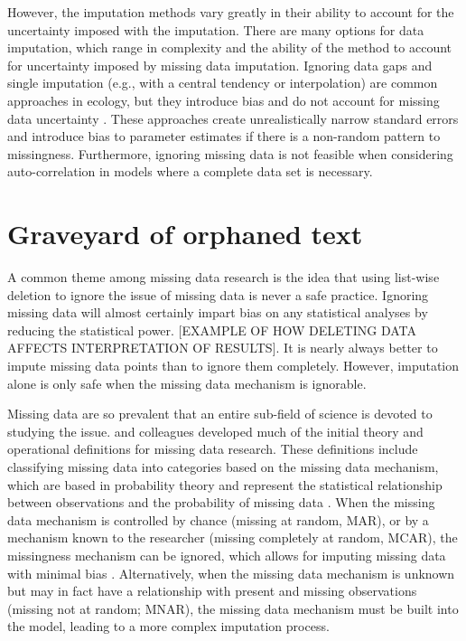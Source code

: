 
 
 
 
 However, the imputation methods vary greatly in their ability to account for the uncertainty imposed with the imputation. There are many options for data imputation, which range in complexity and the ability of the method to account for uncertainty imposed by missing data imputation. Ignoring data gaps and single imputation (e.g., with a central tendency or interpolation) are common approaches in ecology, but they introduce bias and do not account for missing data uncertainty \citep{nakagawa_missing_2008, graham_missing_2009}. These approaches create unrealistically narrow standard errors \citep{nakagawa_missing_2015,mcknight_missing_2007} and introduce bias to parameter estimates if there is a non-random pattern to missingness. Furthermore, ignoring missing data is not feasible when considering auto-correlation in models where a complete data set is necessary. 


 \section*{Graveyard of orphaned text} %
A common theme among missing data research is the idea that using list-wise deletion to ignore the issue of missing data is never a safe practice. Ignoring missing data will almost certainly impart bias on any statistical analyses by reducing the statistical power. [EXAMPLE OF HOW DELETING DATA AFFECTS INTERPRETATION OF RESULTS]. It is nearly always better to impute missing data points than to ignore them completely. However, imputation alone is only safe when the missing data mechanism is ignorable.  



Missing data are so prevalent that an entire sub-field of science is devoted to studying the issue. \cite{rubin_inference_1976} and colleagues developed much of the initial theory and operational definitions for missing data research. These definitions include classifying missing data into categories based on the missing data mechanism, which are based in probability theory and represent the statistical relationship between observations and the probability of missing data \citep{rubin_inference_1976}. When the missing data mechanism is controlled by chance (missing at random, MAR), or by a mechanism known to the researcher (missing completely at random, MCAR), the missingness mechanism can be ignored, which allows for imputing missing data with minimal bias \citep{little_statistical_2002, nakagawa_missing_2015}. Alternatively, when the missing data mechanism is unknown but may in fact have a relationship with present and missing observations (missing not at random; MNAR), the missing data mechanism must be built into the model, leading to a more complex imputation process. 


